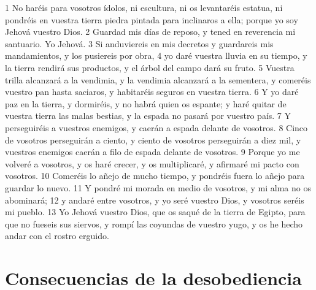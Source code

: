 1 No haréis para vosotros ídolos, ni escultura,  ni os levantaréis estatua, ni pondréis en vuestra tierra piedra pintada para inclinaros a ella; porque yo soy Jehová vuestro Dios.
2 Guardad mis días de reposo, y tened en reverencia mi santuario. Yo Jehová.
3 Si anduviereis en mis decretos y guardareis mis mandamientos, y los pusiereis por obra,
4 yo daré vuestra lluvia en su tiempo, y la tierra rendirá sus productos, y el árbol del campo dará su fruto.
5 Vuestra trilla alcanzará a la vendimia, y la vendimia alcanzará a la sementera, y comeréis vuestro pan hasta saciaros, y habitaréis seguros en vuestra tierra.
6 Y yo daré paz en la tierra, y dormiréis, y no habrá quien os espante; y haré quitar de vuestra tierra las malas bestias, y la espada no pasará por vuestro país.
7 Y perseguiréis a vuestros enemigos, y caerán a espada delante de vosotros.
8 Cinco de vosotros perseguirán a ciento, y ciento de vosotros perseguirán a diez mil, y vuestros enemigos caerán a filo de espada delante de vosotros.
9 Porque yo me volveré a vosotros, y os haré crecer, y os multiplicaré, y afirmaré mi pacto con vosotros.
10 Comeréis lo añejo de mucho tiempo, y pondréis fuera lo añejo para guardar lo nuevo.
11 Y pondré mi morada en medio de vosotros, y mi alma no os abominará;
12 y andaré entre vosotros, y yo seré vuestro Dios, y vosotros seréis mi pueblo.
13 Yo Jehová vuestro Dios, que os saqué de la tierra de Egipto, para que no fueseis sus siervos, y rompí las coyundas de vuestro yugo, y os he hecho andar con el rostro erguido.

\section*{Consecuencias de la desobediencia}

